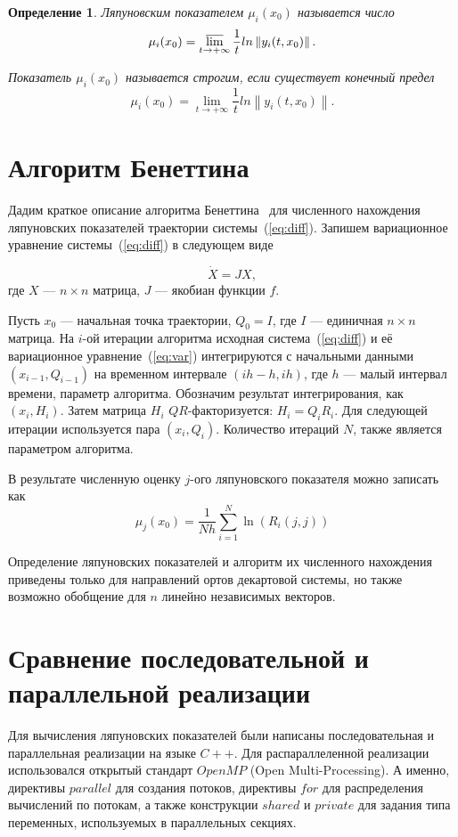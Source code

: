 \documentclass{spisok-article}
\newtheorem{definition}{Определение}
\begin{document}
\begin{definition} \label{def:lce}
Ляпуновским показателем $\mu _i (x_0)$ называется число $$\mu _i (x_0) = \varlimsup \limits _{t \rightarrow +\infty} \frac{1}{t} ln \left \| y_i (t,x_0) \right \|.$$

Показатель $\mu _i (x_0)$ называется строгим, если существует конечный предел $$\mu _i (x_0) = \lim \limits _{t \rightarrow +\infty} \frac{1}{t} ln \left \| y_i (t,x_0) \right \|.$$
\end{definition}

\section{Алгоритм Бенеттина}

Дадим краткое описание алгоритма Бенеттина~\cite{art:alg_benettin_teory, art:alg_benettin_app} для численного нахождения ляпуновских показателей траектории системы~(\ref{eq:diff}). Запишем вариационное уравнение системы~(\ref{eq:diff}) в следующем виде

\begin{equation} \label{eq:var}
\dot{X} = JX,
\end{equation}
где $X$ --- $n \times n$ матрица, $J$ --- якобиан функции $f$.

Пусть $x_0$ --- начальная точка траектории, $Q_0 = I$, где $I$ --- единичная $n \times n$ матрица. На $i$-ой итерации алгоритма исходная система~(\ref{eq:diff}) и её вариационное уравнение~(\ref{eq:var}) интегрируются с начальными данными $(x_{i-1}, Q_{i-1})$ на временном интервале $\left ( ih-h, ih \right )$, где $h$ --- малый интервал времени, параметр алгоритма. Обозначим результат интегрирования, как $(x_i, H_i)$. Затем матрица $H_i$ $QR$-факторизуется: $H_i = Q_i R_i$. Для следующей итерации используется пара $(x_i, Q_i)$. Количество итераций $N$, также является параметром алгоритма.

В результате численную оценку $j$-ого ляпуновского показателя можно записать как
\begin{equation} \label{eq:number_lce}
\mu _{j} (x_0) = \frac{1}{Nh} \sum \limits _{i=1} ^{N} \ln(R_i (j,j))
\end{equation}

Определение ляпуновских показателей и алгоритм их численного нахождения приведены только для направлений ортов декартовой системы, но также возможно обобщение для $n$ линейно независимых векторов.

\section{Сравнение последовательной и параллельной реализации}
Для вычисления ляпуновских показателей были написаны последовательная и параллельная
  реализации на языке $C++$. Для распараллеленной реализации использовался открытый стандарт $OpenMP$ (Open Multi-Processing). А именно, директивы $parallel$ для создания потоков, директивы $for$ для распределения вычислений по потокам, а также конструкции $shared$ и $private$ для задания типа переменных, используемых в параллельных секциях.
\end{document}
